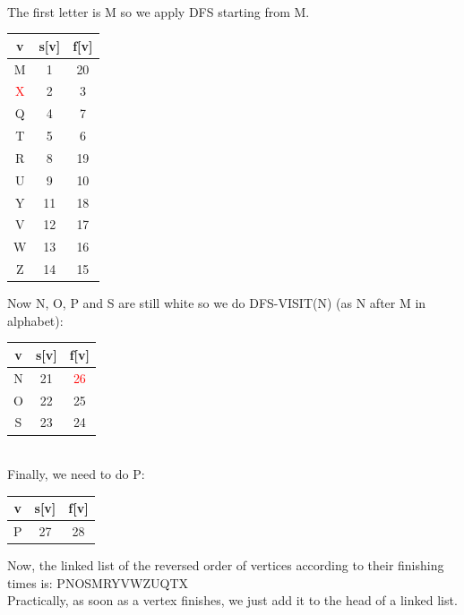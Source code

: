 \documentclass[11pt]{article}
\begin{document}
\begin{enumerate}
    \\ The first letter is M so we apply DFS starting from M.
    \begin{center}
        \begin{tabular}{|c | c | c |} 
        \hline
        v & s[v] & f[v] \\ [0.5ex] 
        \hline\hline
        M & 1 & 20 \\
        \hline
        \textcolor{red}{X} & 2 & 3 \\
        \hline
        Q & 4 & 7 \\
        \hline
        T & 5 & 6 \\
        \hline
        R & 8 & 19 \\
        \hline
        U & 9 & 10 \\
        \hline
        Y & 11 & 18 \\
        \hline
        V & 12 & 17 \\
        \hline
        W & 13 & 16 \\
        \hline
        Z & 14 & 15 \\ [1ex] 
        \hline
        \end{tabular}
    \end{center}
    Now N, O, P and S are still white so we do DFS-VISIT(N) (as N after M in alphabet):
    \begin{center}
        \begin{tabular}{|c | c | c |} 
        \hline
        v & s[v] & f[v] \\ [0.5ex] 
        \hline\hline
        N & 21 & \textcolor{red}{26} \\
        \hline
        O & 22 & 25 \\
        \hline
        S & 23 & 24 \\ [1ex] 
        \hline
        \end{tabular}
    \end{center}
    \\ Finally, we need to do P:
    \begin{center}
        \begin{tabular}{|c | c | c |} 
        \hline
        v & s[v] & f[v] \\ [0.5ex] 
        \hline\hline
        P & 27 & 28 \\ [1ex]
        \hline
        \end{tabular}
    \end{center}
    Now, the linked list of the reversed order of vertices according to their finishing times is: PNOSMRYVWZUQTX
    \\ Practically, as soon as a vertex finishes, we just add it to the head of a linked list.
    

\end{enumerate}
\end{document}
